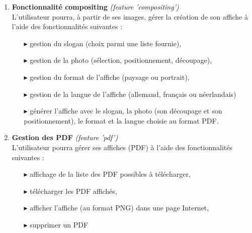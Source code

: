 \documentclass{article}
\begin{document}
\begin{sffamily}
\begin{enumerate}
\begin{itemize}
\end{itemize}
\item \textbf{Fonctionnalité compositing} \textit{(feature 'compositing')}\\
L'utilisateur pourra, à partir de ses images, gérer la création de son affiche à l'aide des fonctionnalités suivantes :
\begin{itemize}
\item[\hspace*{0.25cm}$\blacktriangleright$] gestion du slogan (choix parmi une liste fournie),
\item[\hspace*{0.25cm}$\blacktriangleright$] gestion de la photo (sélection, positionnement, découpage),
\item[\hspace*{0.25cm}$\blacktriangleright$] gestion du format de l'affiche (paysage ou portrait),
\item[\hspace*{0.25cm}$\blacktriangleright$] gestion de la langue de l'affiche (allemand, français ou néerlandais)
\item[\hspace*{0.25cm}$\blacktriangleright$] générer l'affiche avec le slogan, la photo (son découpage et son positionnement), le format et la langue choisie au format PDF. 
\\
\end{itemize}
\item \textbf{Gestion des PDF} \textit{(feature 'pdf')}\\
L'utilisateur pourra gérer ses affiches (PDF) à l'aide des fonctionnalités suivantes :
\begin{itemize}
\item[\hspace*{0.25cm}$\blacktriangleright$] affichage de la liste des PDF possibles à télécharger,
\item[\hspace*{0.25cm}$\blacktriangleright$] télécharger les PDF affichés,
\item[\hspace*{0.25cm}$\blacktriangleright$] afficher l'affiche (au format PNG) dans une page Internet,
\item[\hspace*{0.25cm}$\blacktriangleright$] supprimer un PDF
\end{itemize}
\end{enumerate}


\end{sffamily}
\end{document}
